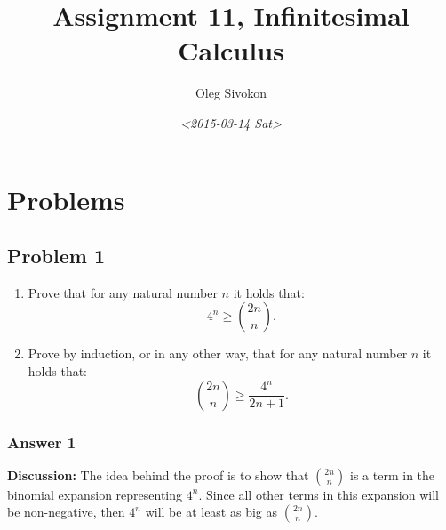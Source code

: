 \documentclass[11pt]{article}
\author{Oleg Sivokon}
\date{\textit{<2015-03-14 Sat>}}
\title{Assignment 11, Infinitesimal Calculus}
\begin{document}
\maketitle
\tableofcontents



\clearpage

\section{Problems}
\label{sec-1}

\subsection{Problem 1}
\label{sec-1-1}
\begin{enumerate}
\item Prove that for any natural number $n$ it holds that:
\begin{equation*}
  4^n \geq {2n \choose n}.
\end{equation*}

\item Prove by induction, or in any other way, that for any natural number $n$
it holds that:
\begin{equation*}
   {2n \choose n} \geq \frac{4^n}{2n+1}.
\end{equation*}
\end{enumerate}

\subsubsection{Answer 1}
\label{sec-1-1-1}
\textbf{Discussion:} The idea behind the proof is to show that ${2n \choose n}$ is
a term in the binomial expansion representing $4^n$.  Since all other terms
in this expansion will be non-negative, then $4^n$ will be at least as big
as ${2n \choose n}$.
\end{document}
